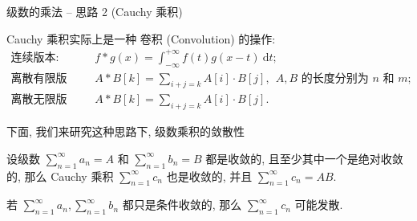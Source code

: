 
\begin{frame}{级数的乘法 -- 思路 2 (Cauchy 乘积)}

Cauchy 乘积实际上是一种 \alert{卷积 (Convolution)} 的操作:
\begin{align*}
\text{连续版本:} & \quad f * g (x) = \int_{-\infty}^{+\infty} f(t) g(x - t) ~ \mathrm{d} t; \\
\text{离散有限版本:} & \quad A * B [k] = \sum_{i+j=k} A[i] \cdot B[j], ~~ \text{$A, B$ 的长度分别为 $n$ 和 $m$}; \\
\text{离散无限版本:} & \quad A * B [k] = \sum_{i+j=k} A[i] \cdot B[j].
\end{align*}

下面, 我们来研究这种思路下, 级数乘积的敛散性

\pause

\begin{thm}
设级数 $\sum\limits_{n=1}^\infty a_n = A$ 和 $\sum\limits_{n=1}^\infty b_n = B$ 都是收敛的, 且至少其中一个是绝对收敛的, 那么 Cauchy 乘积 $\sum\limits_{n=1}^\infty c_n$ 也是收敛的, 并且 $\sum\limits_{n=1}^\infty c_n = AB.$

\pause

若 $\sum\limits_{n=1}^\infty a_n, \sum\limits_{n=1}^\infty b_n$ 都只是条件收敛的, 那么 $\sum\limits_{n=1}^\infty c_n$ 可能发散.
\end{thm}

\end{frame}


